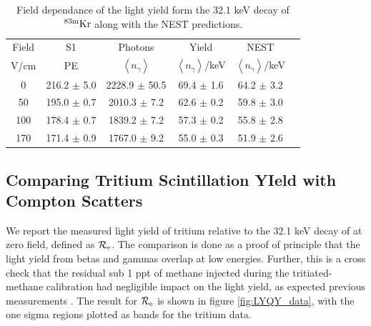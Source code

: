 \renewcommand{\baselinestretch}{1}
\small\normalsize
\begin{table}[h!]
\begin{center}
\begin{tabular}{|c|c|c|c|c|c|}
\hline
Field	&S1			& Photons						& Yield 								&NEST	 \\
V/cm	& PE					& $\left<n_{\gamma}\right>$		& $\left<n_{\gamma}\right>$/keV	& $\left<n_{\gamma}\right>$/keV \\ \hline
0 		&	216.2 $\pm$ 5.0 	&2228.9 $\pm$ 50.5 &	69.4 $\pm$	1.6 	&	64.2 $\pm$ 3.2  \\ \hline
50 		&	195.0 $\pm$ 0.7 	&2010.3 $\pm$ 7.2   & 	62.6 $\pm$	0.2	&	59.8 $\pm$ 3.0 \\ \hline
100 	&	178.4 $\pm$ 0.7 	&1839.2 $\pm$ 	7.2	 &	57.3 $\pm$ 0.2 	&	55.8 $\pm$ 2.8 \\ \hline
170 	&  171.4 $\pm$ 0.9		&1767.0 $\pm$ 	9.2  &	55.0 $\pm$ 0.3 	&	51.9 $\pm$ 2.6 \\ \hline
\end{tabular}
\caption{Field dependance of the light yield form the 32.1 keV decay of $\rm^{83m}Kr$ along with the NEST \cite{NEST_2013} predictions.}
\label{table:kr32}
\end{center}
\end{table}
\renewcommand{\baselinestretch}{2}
\small\normalsize


\subsection{Comparing Tritium Scintillation YIeld with Compton Scatters}

We report the measured light yield of tritium relative to the 32.1 keV decay of \KrCal at zero field, defined as $\rm \mathcal{R}_e$. The comparison is done as a proof of principle that the light yield from betas and gammas overlap at low energies. Further, this is a cross check that the residual sub 1 ppt of methane injected during the tritiated-methane calibration had negligible impact on the light yield, as expected previous measurements \cite{Kirill_Methane}. The result for $\rm \mathcal{R}_e$ is shown in figure \ref{fig:LYQY_data}, with the one sigma regions plotted as bands for the tritium data.

